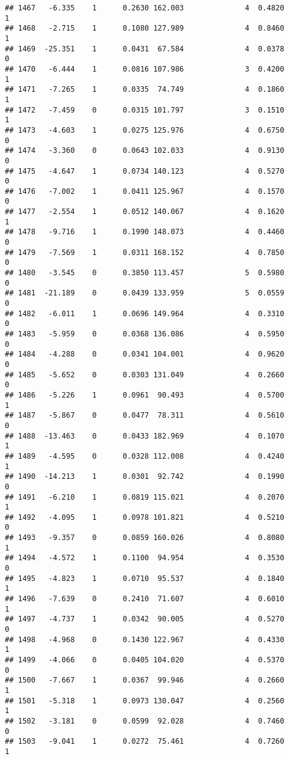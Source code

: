 \documentclass[
]{article}
\begin{document}
\begin{verbatim}
## 1467   -6.335    1      0.2630 162.003              4  0.4820      1
## 1468   -2.715    1      0.1080 127.989              4  0.8460      1
## 1469  -25.351    1      0.0431  67.584              4  0.0378      0
## 1470   -6.444    1      0.0816 107.986              3  0.4200      1
## 1471   -7.265    1      0.0335  74.749              4  0.1860      1
## 1472   -7.459    0      0.0315 101.797              3  0.1510      1
## 1473   -4.603    1      0.0275 125.976              4  0.6750      0
## 1474   -3.360    0      0.0643 102.033              4  0.9130      0
## 1475   -4.647    1      0.0734 140.123              4  0.5270      0
## 1476   -7.002    1      0.0411 125.967              4  0.1570      0
## 1477   -2.554    1      0.0512 140.067              4  0.1620      1
## 1478   -9.716    1      0.1990 148.073              4  0.4460      0
## 1479   -7.569    1      0.0311 168.152              4  0.7850      0
## 1480   -3.545    0      0.3850 113.457              5  0.5980      0
## 1481  -21.189    0      0.0439 133.959              5  0.0559      0
## 1482   -6.011    1      0.0696 149.964              4  0.3310      0
## 1483   -5.959    0      0.0368 136.086              4  0.5950      0
## 1484   -4.288    0      0.0341 104.001              4  0.9620      0
## 1485   -5.652    0      0.0303 131.049              4  0.2660      0
## 1486   -5.226    1      0.0961  90.493              4  0.5700      1
## 1487   -5.867    0      0.0477  78.311              4  0.5610      0
## 1488  -13.463    0      0.0433 182.969              4  0.1070      1
## 1489   -4.595    0      0.0328 112.008              4  0.4240      1
## 1490  -14.213    1      0.0301  92.742              4  0.1990      0
## 1491   -6.210    1      0.0819 115.021              4  0.2070      1
## 1492   -4.095    1      0.0978 101.821              4  0.5210      0
## 1493   -9.357    0      0.0859 160.026              4  0.8080      1
## 1494   -4.572    1      0.1100  94.954              4  0.3530      0
## 1495   -4.823    1      0.0710  95.537              4  0.1840      1
## 1496   -7.639    0      0.2410  71.607              4  0.6010      1
## 1497   -4.737    1      0.0342  90.005              4  0.5270      0
## 1498   -4.968    0      0.1430 122.967              4  0.4330      1
## 1499   -4.066    0      0.0405 104.020              4  0.5370      0
## 1500   -7.667    1      0.0367  99.946              4  0.2660      1
## 1501   -5.318    1      0.0973 130.047              4  0.2560      1
## 1502   -3.181    0      0.0599  92.028              4  0.7460      0
## 1503   -9.041    1      0.0272  75.461              4  0.7260      1

\end{verbatim}
\end{document}
